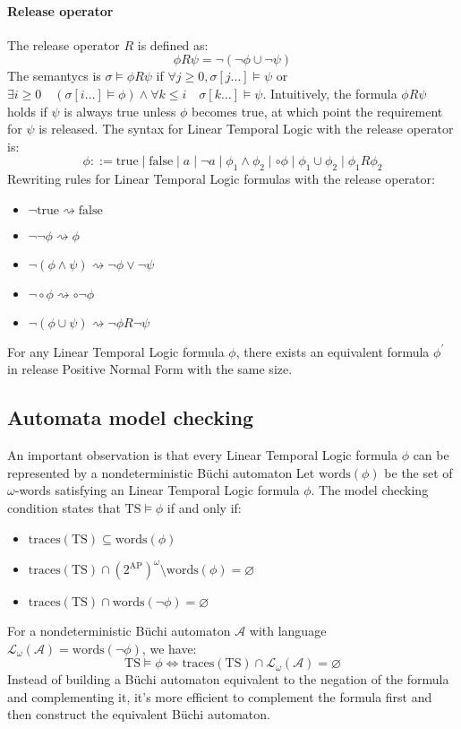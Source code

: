 \paragraph*{Release operator}
The release operator $R$ is defined as: 
\[\phi R \psi =\lnot(\lnot\phi\cup\lnot\psi)\]
\noindent The semantycs is $\sigma\models\phi R \psi$ if $\forall j \geq 0, \sigma[j\dots]\models\psi$ or $\exists i \geq 0 \quad (\sigma[i\dots]\models\phi)\land \forall k \leq i \quad \sigma[k\dots]\models\psi$.
Intuitively, the formula $\phi R \psi$ holds if $\psi$ is always true unless $\phi$ becomes true, at which point the requirement for $\psi$ is released. 
The syntax for Linear Temporal Logic with the release operator is:
\[\phi::=\text{true}\mid\text{false}\mid a \mid\lnot a\mid \phi_1\land\phi_2\mid\circ\phi\mid\phi_1\cup\phi_2\mid\phi_1 R \phi_2\]
\noindent Rewriting rules for Linear Temporal Logic formulas with the release operator:
\begin{itemize}
    \item $\lnot\text{true}\rightsquigarrow \text{false}$
    \item $\lnot\lnot\phi\rightsquigarrow \phi$
    \item $\lnot(\phi\land\psi)\rightsquigarrow\lnot\phi\lor\lnot\psi$
    \item $\lnot\circ\phi\rightsquigarrow\circ\lnot\phi$
    \item $\lnot(\phi\cup\psi)\rightsquigarrow\lnot\phi R \lnot\psi$
\end{itemize}
\noindent For any Linear Temporal Logic formula $\phi$, there exists an equivalent formula $\phi^\prime$ in release Positive Normal Form with the same size.

\subsection{Automata model checking}
An important observation is that every Linear Temporal Logic formula $\phi$ can be represented by a nondeterministic Büchi automaton
Let $\text{words}(\phi)$ be the set of $\omega$-words satisfying an Linear Temporal Logic formula $\phi$. 
The model checking condition states that $\text{TS}\models\phi$ if and only if: 
\begin{itemize}
    \item $\text{traces}(\text{TS}) \subseteq \text{words}(\phi)$
    \item $\text{traces}(\text{TS}) \cap \left( 2^{\text{AP}} \right)^{\omega} \setminus \text{words}(\phi) = \varnothing$
    \item $\text{traces}(\text{TS}) \cap \text{words}(\lnot \phi) = \varnothing$
\end{itemize}
\noindent For a nondeterministic Büchi automaton $\mathcal{A}$ with language $\mathcal{L}_{\omega}(\mathcal{A})=\text{words}(\lnot\phi)$, we have:
\[\text{TS}\models\phi\Leftrightarrow\text{traces}(\text{TS})\cap\mathcal{L}_{\omega}(\mathcal{A})=\varnothing\]
Instead of building a Büchi automaton equivalent to the negation of the formula and complementing it, it's more efficient to complement the formula first and then construct the equivalent Büchi automaton.

